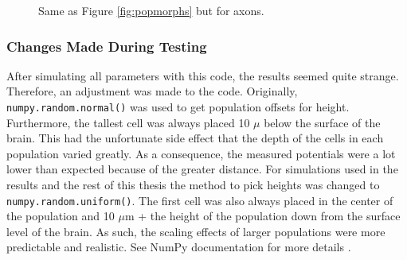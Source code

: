 \documentclass[final, a4paper,masters,en,listoffigures,listoftables,norwegiandates]{NMBU}
\begin{document}
\begin{figure}[htbp]
    \centering
    \caption{Same as Figure \ref{fig:popmorphs} but for axons.}
    \label{fig:Axonpopmorphs}
\end{figure}

\subsubsection{Changes Made During Testing} \label{subsubsec:CodeChanges}
After simulating all parameters with this code, the results seemed quite strange. Therefore, an adjustment was made to the code. Originally, \texttt{numpy.random.normal()} was used to get population offsets for height. Furthermore, the tallest cell was always placed 10 $\mu$ below the surface of the brain. This had the unfortunate side effect that the depth of the cells in each population varied greatly. As a consequence, the measured potentials were a lot lower than expected because of the greater distance. For simulations used in the results and the rest of this thesis the method to pick heights was changed to \texttt{numpy.random.uniform()}. The first cell was also always placed in the center of the population and 10 $\mu$m + the height of the population down from the surface level of the brain. As such, the scaling effects of larger populations were more predictable and realistic. See NumPy documentation for more details \cite{numpyDocumentation}.
\end{document}
